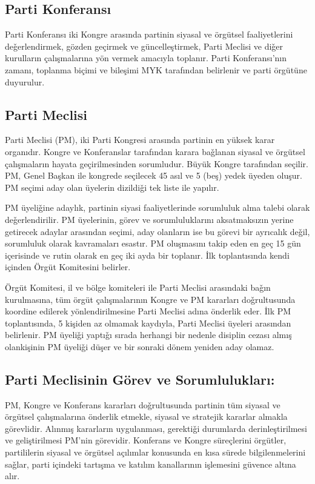 \documentclass[11pt]{article} %
\begin{document}
\subsection{Parti Konferansı}
Parti Konferansı iki Kongre arasında partinin siyasal ve örgütsel faaliyetlerini deǧerlendirmek, gözden geçirmek ve güncelleştirmek, Parti Meclisi ve diǧer kurulların çalışmalarına yön vermek amacıyla toplanır. Parti Konferansı’nın zamanı, toplanma biçimi ve bileşimi MYK tarafından belirlenir ve parti örgütüne duyurulur.

\subsection{Parti Meclisi}

Parti Meclisi (PM), iki Parti Kongresi arasında partinin en yüksek karar organıdır. Kongre ve Konferanslar tarafından karara baǧlanan siyasal ve örgütsel çalışmaların hayata geçirilmesinden sorumludur. Büyük Kongre tarafından seçilir.
PM, Genel Başkan ile kongrede seçilecek 45 asıl ve 5 (beş) yedek üyeden oluşur.
PM seçimi aday olan üyelerin dizildiǧi tek liste ile yapılır.

PM üyeliǧine adaylık, partinin siyasi faaliyetlerinde sorumluluk alma talebi olarak deǧerlendirilir. PM üyelerinin, görev ve sorumluluklarını aksatmaksızın yerine getirecek adaylar arasından seçimi, aday olanların ise bu görevi bir ayrıcalık deǧil, sorumluluk olarak kavramaları esastır.
PM oluşmasını takip eden en geç 15 gün içerisinde ve rutin olarak en geç iki ayda bir toplanır. İlk toplantısında kendi içinden Örgüt Komitesini belirler.

Örgüt Komitesi, il ve bölge komiteleri ile Parti Meclisi arasındaki baǧın kurulmasına, tüm örgüt çalışmalarının Kongre ve PM kararları doǧrultusunda koordine edilerek yönlendirilmesine Parti Meclisi adına önderlik eder. İlk PM toplantısında, 5 kişiden az olmamak kaydıyla, Parti Meclisi üyeleri arasından belirlenir.
PM üyeliǧi yaptıǧı sırada herhangi bir nedenle disiplin cezası almış olankişinin
PM üyeliǧi düşer ve bir sonraki dönem yeniden aday olamaz.

\subsection{Parti Meclisinin Görev ve Sorumlulukları:}

PM, Kongre ve Konferans kararları doǧrultusunda partinin tüm siyasal ve örgütsel çalışmalarına önderlik etmekle, siyasal ve stratejik kararlar almakla görevlidir. Alınmış kararların uygulanması, gerektiǧi durumlarda derinleştirilmesi ve geliştirilmesi PM’nin görevidir. Konferans ve Kongre süreçlerini örgütler, partililerin siyasal ve örgütsel açılımlar konusunda en kısa sürede bilgilenmelerini saǧlar, parti içindeki tartışma ve katılım kanallarının işlemesini güvence altına alır.
\end{document}
